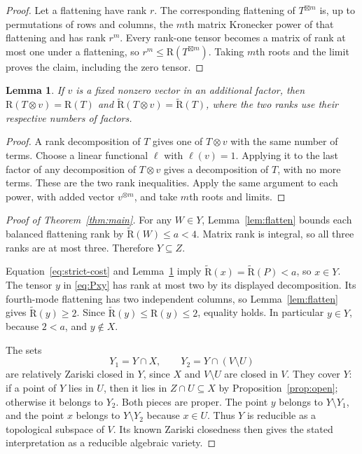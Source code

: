 \documentclass[10pt,a4paper]{article}
\newtheorem{lemma}[theorem]{Lemma}
\theoremstyle{definition}
\theoremstyle{remark}
\numberwithin{equation}{section}
\newcommand{\AR}{\widetilde{\mathrm R}}
\newcommand{\R}{\mathrm R}
\begin{document}
\begin{proof}
Let a flattening have rank $r$. The corresponding flattening of
$T^{\boxtimes m}$ is, up to permutations of rows and columns,
the $m$th matrix Kronecker power of that flattening and has
rank $r^m$. Every rank-one tensor becomes a matrix of rank at
most one under a flattening, so $r^m\leq\R(T^{\boxtimes m})$.
Taking $m$th roots and the limit proves the claim, including the
zero tensor.
\end{proof}

\begin{lemma}\label{lem:append}
If $v$ is a fixed nonzero vector in an additional factor, then
$\R(T\otimes v)=\R(T)$ and $\AR(T\otimes v)=\AR(T)$,
where the two ranks use their respective numbers of factors.
\end{lemma}

\begin{proof}
A rank decomposition of $T$ gives one of $T\otimes v$ with
the same number of terms. Choose a linear functional $\ell$
with $\ell(v)=1$. Applying it to the last factor of any
decomposition of $T\otimes v$ gives a decomposition of $T$,
with no more terms. These are the two rank inequalities.
Apply the same argument to each power, with added vector
$v^{\otimes m}$, and take $m$th roots and limits.
\end{proof}

\begin{proof}[Proof of Theorem~\ref{thm:main}]
For any $W\in Y$, Lemma~\ref{lem:flatten} bounds each balanced
flattening rank by $\AR(W)\leq a<4$. Matrix rank is integral,
so all three ranks are at most three. Therefore $Y\subseteq Z$.

Equation~\eqref{eq:strict-cost} and Lemma~\ref{lem:append} imply
$\AR(x)=\AR(P)<a$, so $x\in Y$. The tensor $y$ in
\eqref{eq:Pxy} has rank at most two by its displayed decomposition.
Its fourth-mode flattening has two independent columns, so
Lemma~\ref{lem:flatten} gives $\AR(y)\geq2$. Since
$\AR(y)\leq\R(y)\leq2$, equality holds. In particular
$y\in Y$, because $2<a$, and $y\notin X$.

The sets
\[
 Y_1=Y\cap X,\qquad Y_2=Y\cap(V\setminus U)
\]
are relatively Zariski closed in $Y$, since $X$ and $V\setminus U$
are closed in $V$. They cover $Y$: if a point of $Y$ lies in $U$,
then it lies in $Z\cap U\subseteq X$ by
Proposition~\ref{prop:open}; otherwise it belongs to $Y_2$.
Both pieces are proper. The point $y$ belongs to $Y\setminus Y_1$,
and the point $x$ belongs to $Y\setminus Y_2$ because $x\in U$.
Thus $Y$ is reducible as a topological subspace of $V$.
Its known Zariski closedness \cite[Theorem~1.2]{CHNVZ2024}
then gives the stated interpretation as a reducible algebraic
variety.
\end{proof}
\end{document}
